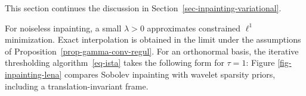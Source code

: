 This section continues the discussion in Section~\ref{sec-inpainting-variational}.

For noiseless inpainting, a small $\lambda>0$ approximates constrained $\ell^1$ minimization. Exact interpolation is obtained in the limit under the assumptions of Proposition~\ref{prop-gamma-conv-regul}.
For an orthonormal basis, the iterative thresholding algorithm~\eqref{eq-ista} takes the following form for $\tau=1$:
Figure \ref{fig-inpainting-lena} compares Sobolev inpainting with wavelet sparsity priors, including a translation-invariant frame.


